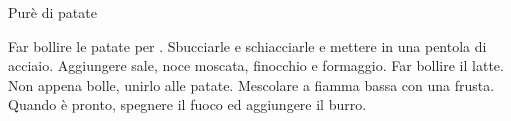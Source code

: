 \begin{recipe}{Purè di patate}
    \begin{header}

    \end{header}
    
    \begin{ingredients}[10]
    \end{ingredients}
    
    \begin{preparation}
        \step Far bollire le patate per .
        \step Sbucciarle e schiacciarle e mettere in una pentola di acciaio.
        \step Aggiungere sale, noce moscata, finocchio e formaggio.
        \step Far bollire il latte.
        \step Non appena bolle, unirlo alle patate. Mescolare a fiamma bassa con una frusta.
        \step Quando è pronto, spegnere il fuoco ed aggiungere il burro.
    \end{preparation}
    
\end{recipe}
